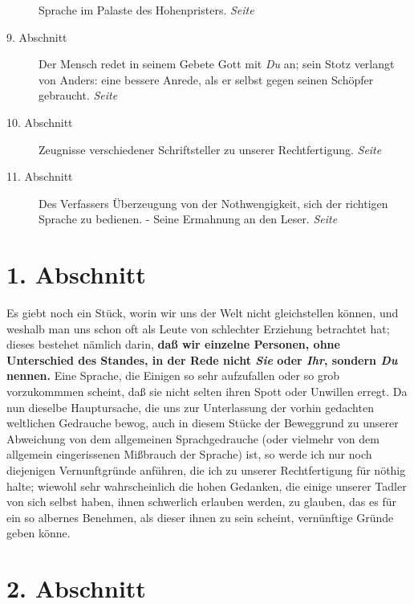 \begin{description}
Sprache im Palaste des Hohenpristers.
\dotfill \textit{Seite \pageref{kap10_ab8}}\\
\item[9. Abschnitt] Der Mensch redet in seinem Gebete Gott mit \textit{Du} an;
sein
Stotz verlangt von Anders: eine bessere Anrede, als er selbst gegen seinen
Schöpfer gebraucht.
\dotfill \textit{Seite \pageref{kap10_ab9}}\\
\item[10. Abschnitt] Zeugnisse verschiedener Schriftsteller zu unserer
Rechtfertigung.
\dotfill \textit{Seite \pageref{kap10_ab10}}\\
\item[11. Abschnitt] Des Verfassers Überzeugung von der Nothwengigkeit, sich
der richtigen Sprache zu bedienen. - Seine Ermahnung an den Leser.
\dotfill \textit{Seite \pageref{kap10_ab11}}

\end{description}

\newpage

\section{1. Abschnitt} \label{kap10_ab1}

Es giebt noch ein Stück, worin wir uns der Welt nicht
gleichstellen können, und
weshalb man uns schon oft als Leute von schlechter Erziehung betrachtet hat;
dieses bestehet nämlich darin, \textbf{daß wir einzelne
Personen, ohne Unterschied des
Standes, in der Rede nicht \textit{Sie} oder \textit{Ihr}, sondern \textit{Du}
nennen.} Eine
Sprache, die Einigen so sehr aufzufallen oder so grob vorzukommmen scheint, daß
sie nicht selten ihren Spott oder Unwillen erregt. Da nun dieselbe Hauptursache,
die uns zur Unterlassung der vorhin gedachten weltlichen Gedrauche bewog, auch
in diesem Stücke der Beweggrund zu unserer Abweichung von dem allgemeinen
Sprachgedrauche (oder vielmehr von dem allgemein eingerissenen Mißbrauch der
Sprache) ist, so werde ich nur noch diejenigen Vernunftgründe anführen, die ich
zu unserer Rechtfertigung für nöthig halte; wiewohl sehr wahrscheinlich die
hohen Gedanken, die einige unserer Tadler von sich selbst haben, ihnen
schwerlich erlauben werden, zu glauben, das es für ein so albernes Benehmen, als
dieser ihnen zu sein scheint, vernünftige Gründe geben könne.

\section{2. Abschnitt} \label{kap10_ab2}

